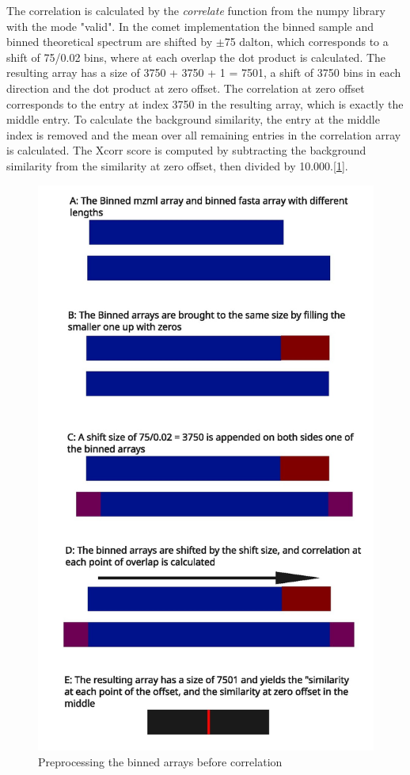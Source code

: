 \documentclass[11pt]{article}
\begin{document}
The correlation is calculated by the \textit{correlate} function from the numpy library with the mode "valid". In the comet implementation the binned sample and binned theoretical spectrum are shifted by $\pm$75 dalton, which corresponds to a shift of 75/0.02 bins, where at each overlap the dot product is calculated. The resulting array has a size of 3750 + 3750 + 1 = 7501, a shift of 3750 bins in each direction and the dot product at zero offset. The correlation at zero offset corresponds to the entry at index 3750 in the resulting array, which is exactly the middle entry. To calculate the background similarity, the entry at the middle index is removed and the mean over all remaining entries in the correlation array is calculated. The Xcorr score is computed by subtracting the background similarity from the similarity at zero offset, then divided by 10.000.[\cref{fig:corr}].
\begin{figure}
\includegraphics[width=\linewidth]{figs/crosscorr.jpg} 
\caption{Preprocessing the binned arrays before correlation}
\label{fig:corr}
\end{figure}
\end{document}
